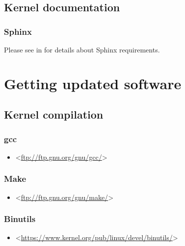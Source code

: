 \documentclass[a4paper,8pt,english]{sphinxmanual}
\begin{document}
\subsection{Kernel documentation}
\label{process/changes:kernel-documentation}

\subsubsection{Sphinx}
\label{process/changes:sphinx}
Please see  in 
for details about Sphinx requirements.


\section{Getting updated software}
\label{process/changes:getting-updated-software}

\subsection{Kernel compilation}
\label{process/changes:id2}

\subsubsection{gcc}
\label{process/changes:id3}\begin{itemize}
\item {} 
\textless{}\href{ftp://ftp.gnu.org/gnu/gcc/}{ftp://ftp.gnu.org/gnu/gcc/}\textgreater{}

\end{itemize}


\subsubsection{Make}
\label{process/changes:id4}\begin{itemize}
\item {} 
\textless{}\href{ftp://ftp.gnu.org/gnu/make/}{ftp://ftp.gnu.org/gnu/make/}\textgreater{}

\end{itemize}


\subsubsection{Binutils}
\label{process/changes:id5}\begin{itemize}
\item {} 
\textless{}\href{https://www.kernel.org/pub/linux/devel/binutils/}{https://www.kernel.org/pub/linux/devel/binutils/}\textgreater{}

\end{itemize}
\end{document}
